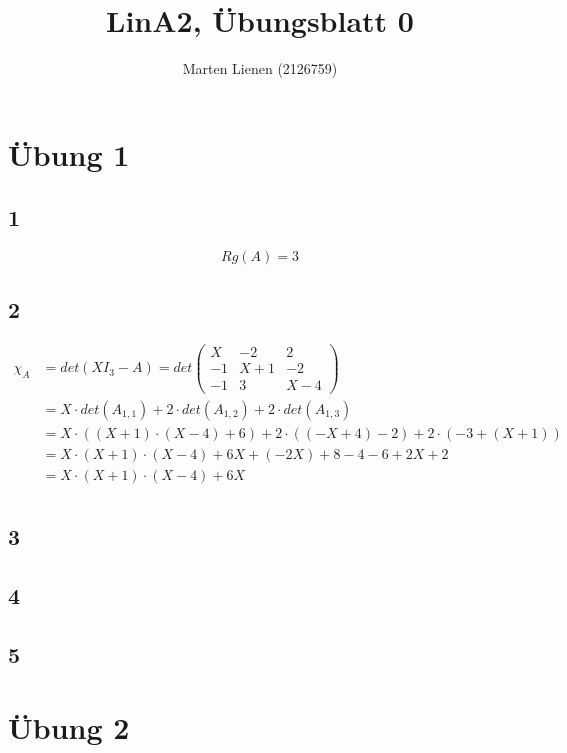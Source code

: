 \documentclass[a4paper,10pt]{article}
\title{LinA2, Übungsblatt 0}
\author{Marten Lienen (2126759)}
\begin{document}
\maketitle

\section*{Übung 1}

\subsection*{1}

\begin{equation}
Rg(A) = 3
\end{equation}

\subsection*{2}

\begin{align}
\chi_A & = det(XI_3 - A) = det
\begin{pmatrix}
 X & -2 & 2\\
 -1 & X + 1 & -2\\
 -1 & 3 & X - 4
\end{pmatrix}\\
& = X \cdot det(A_{1,1}) + 2 \cdot det(A_{1,2}) + 2 \cdot det(A_{1,3})\\
& = X \cdot ((X + 1) \cdot (X - 4) + 6) + 2 \cdot ((-X + 4) - 2) + 2 \cdot (-3 + (X + 1))\\
& = X \cdot (X + 1) \cdot (X - 4) + 6X + (-2X) + 8 - 4 - 6 + 2X + 2\\
& = X \cdot (X + 1) \cdot (X - 4) + 6X\\
\end{align}

\subsection*{3}

\subsection*{4}

\subsection*{5}

\section*{Übung 2}
\end{document}
